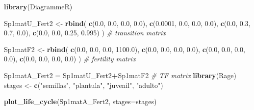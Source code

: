 \documentclass[
]{book}
\newenvironment{Shaded}{\begin{snugshade}}{\end{snugshade}}
\newcommand{\AttributeTok}[1]{\textcolor[rgb]{0.13,0.29,0.53}{#1}}
\newcommand{\CommentTok}[1]{\textcolor[rgb]{0.56,0.35,0.01}{\textit{#1}}}
\newcommand{\FloatTok}[1]{\textcolor[rgb]{0.00,0.00,0.81}{#1}}
\newcommand{\FunctionTok}[1]{\textcolor[rgb]{0.13,0.29,0.53}{\textbf{#1}}}
\newcommand{\NormalTok}[1]{#1}
\newcommand{\OtherTok}[1]{\textcolor[rgb]{0.56,0.35,0.01}{#1}}
\newcommand{\SpecialCharTok}[1]{\textcolor[rgb]{0.81,0.36,0.00}{\textbf{#1}}}
\newcommand{\StringTok}[1]{\textcolor[rgb]{0.31,0.60,0.02}{#1}}
\theoremstyle{definition}
\theoremstyle{definition}
\theoremstyle{definition}
\theoremstyle{definition}
\theoremstyle{remark}
\begin{document}
\begin{Shaded}
\begin{Highlighting}[]
\FunctionTok{library}\NormalTok{(DiagrammeR)}

\NormalTok{Sp1matU\_Fert2 }\OtherTok{\textless{}{-}} \FunctionTok{rbind}\NormalTok{(}
  \FunctionTok{c}\NormalTok{(}\FloatTok{0.0}\NormalTok{, }\FloatTok{0.0}\NormalTok{, }\FloatTok{0.0}\NormalTok{, }\FloatTok{0.0}\NormalTok{),}
  \FunctionTok{c}\NormalTok{(}\FloatTok{0.0001}\NormalTok{, }\FloatTok{0.0}\NormalTok{, }\FloatTok{0.0}\NormalTok{, }\FloatTok{0.0}\NormalTok{),}
  \FunctionTok{c}\NormalTok{(}\FloatTok{0.0}\NormalTok{, }\FloatTok{0.3}\NormalTok{, }\FloatTok{0.7}\NormalTok{, }\FloatTok{0.0}\NormalTok{),}
  \FunctionTok{c}\NormalTok{(}\FloatTok{0.0}\NormalTok{, }\FloatTok{0.0}\NormalTok{, }\FloatTok{0.25}\NormalTok{, }\FloatTok{0.995}\NormalTok{)}
\NormalTok{) }\CommentTok{\# transition matrix}

\NormalTok{Sp1matF2 }\OtherTok{\textless{}{-}} \FunctionTok{rbind}\NormalTok{(}
  \FunctionTok{c}\NormalTok{(}\FloatTok{0.0}\NormalTok{, }\FloatTok{0.0}\NormalTok{, }\FloatTok{0.0}\NormalTok{, }\FloatTok{1100.0}\NormalTok{),}
  \FunctionTok{c}\NormalTok{(}\FloatTok{0.0}\NormalTok{, }\FloatTok{0.0}\NormalTok{, }\FloatTok{0.0}\NormalTok{, }\FloatTok{0.0}\NormalTok{),}
  \FunctionTok{c}\NormalTok{(}\FloatTok{0.0}\NormalTok{, }\FloatTok{0.0}\NormalTok{, }\FloatTok{0.0}\NormalTok{, }\FloatTok{0.0}\NormalTok{),}
  \FunctionTok{c}\NormalTok{(}\FloatTok{0.0}\NormalTok{, }\FloatTok{0.0}\NormalTok{, }\FloatTok{0.0}\NormalTok{, }\FloatTok{0.0}\NormalTok{)}
\NormalTok{) }\CommentTok{\# fertility matrix}

\NormalTok{Sp1matA\_Fert2 }\OtherTok{=}\NormalTok{ Sp1matU\_Fert2}\SpecialCharTok{+}\NormalTok{Sp1matF2 }\CommentTok{\# TF matrix}
\FunctionTok{library}\NormalTok{(Rage)}
\NormalTok{stages }\OtherTok{\textless{}{-}} \FunctionTok{c}\NormalTok{(}\StringTok{"semillas"}\NormalTok{, }\StringTok{"plantula"}\NormalTok{, }\StringTok{"juvenil"}\NormalTok{, }\StringTok{"adulto"}\NormalTok{)}

\FunctionTok{plot\_life\_cycle}\NormalTok{(Sp1matA\_Fert2, }\AttributeTok{stages=}\NormalTok{stages)}
\end{Highlighting}
\end{Shaded}
\end{document}
